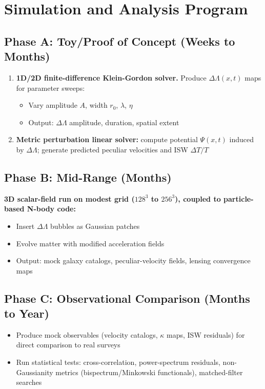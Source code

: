 \documentclass[11pt,a4paper]{article}
\begin{document}
\section{Simulation and Analysis Program}

\subsection{Phase A: Toy/Proof of Concept (Weeks to Months)}

\begin{enumerate}
\item \textbf{1D/2D finite-difference Klein-Gordon solver.} Produce $\Delta\Lambda(x,t)$ maps for parameter sweeps:
\begin{itemize}
\item Vary amplitude $A$, width $r_0$, $\lambda$, $\eta$
\item Output: $\Delta\Lambda$ amplitude, duration, spatial extent
\end{itemize}
\item \textbf{Metric perturbation linear solver:} compute potential $\Psi(x,t)$ induced by $\Delta\Lambda$; generate predicted peculiar velocities and ISW $\Delta T/T$
\end{enumerate}

\subsection{Phase B: Mid-Range (Months)}

\textbf{3D scalar-field run on modest grid ($128^3$ to $256^3$), coupled to particle-based N-body code:}
\begin{itemize}
\item Insert $\Delta\Lambda$ bubbles as Gaussian patches
\item Evolve matter with modified acceleration fields
\item Output: mock galaxy catalogs, peculiar-velocity fields, lensing convergence maps
\end{itemize}

\subsection{Phase C: Observational Comparison (Months to Year)}

\begin{itemize}
\item Produce mock observables (velocity catalogs, $\kappa$ maps, ISW residuals) for direct comparison to real surveys
\item Run statistical tests: cross-correlation, power-spectrum residuals, non-Gaussianity metrics (bispectrum/Minkowski functionals), matched-filter searches
\end{itemize}
\end{document}
